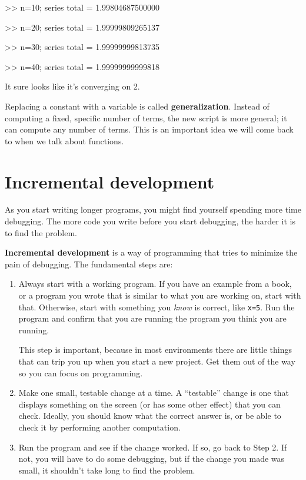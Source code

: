 \begin{code}
>> n=10; series
total = 1.99804687500000

>> n=20; series
total = 1.99999809265137

>> n=30; series
total = 1.99999999813735

>> n=40; series
total = 1.99999999999818
\end{code}

It sure looks like it's converging on 2.

Replacing a constant with a variable is called {\bf generalization}.
Instead of computing a fixed, specific number of terms, the new script
is more general; it can compute any number of terms.
This is an important idea we will come back to when we talk about functions.

\section{Incremental development}


As you start writing longer programs, you might find yourself spending more time debugging.
The more code you write before you start debugging, the harder it is to find
the problem.

{\bf Incremental development} is a way of programming that tries
to minimize the pain of debugging.  The fundamental steps are:

\begin{enumerate}

\item Always start with a working program.  If you have an
example from a book, or a program you wrote that is similar to
what you are working on, start with that.  Otherwise, start with
something you {\em know} is correct, like {\tt x=5}.  Run the program
and confirm that you are running the program you think you are
running.

This step is important, because in most environments there
are little things that can trip you up when you start a new
project.  Get them out of the way so you can focus on programming.

\item Make one small, testable change at a time.  A ``testable''
change is one that displays something on the screen (or has some
other effect) that you can check.  Ideally, you should know what
the correct answer is, or be able to check it by performing another
computation.

\item Run the program and see if the change worked.  If so, go back
to Step 2.  If not, you will have to do some debugging, but if the
change you made was small, it shouldn't take long to find the problem.

\end{enumerate}

